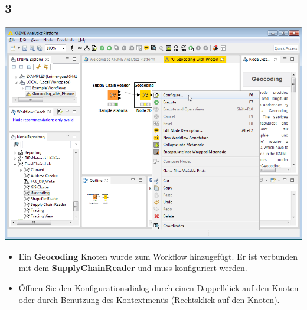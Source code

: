 \documentclass{beamer}
\begin{document}
\subsection{3}
\begin{frame}
	\begin{center}
  		\includegraphics[height=0.6\textheight]{3.png}
	\end{center}
	\begin{itemize}
        \item Ein \textbf{Geocoding} Knoten wurde zum Workflow hinzugefügt. Er ist verbunden mit dem \textbf{SupplyChainReader} und muss konfiguriert werden.
		\item Öffnen Sie den Konfigurationsdialog durch einen Doppelklick auf den Knoten oder durch Benutzung des Kontextmenüs (Rechtsklick auf den Knoten).
	\end{itemize}
\end{frame}
\end{document}
